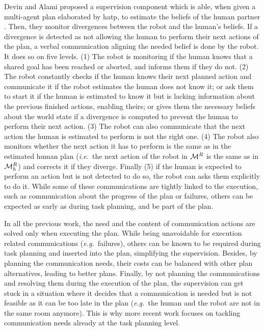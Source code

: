 \documentclass[a4paper,11pt,twoside]{StyleThese}
\begin{document}
Devin and Alami proposed a supervision component which is able, when given a multi-agent plan elaborated by \acrshort{hatp}, to estimate the beliefs of the human partner \cite{devin2016implemented}. Then, they monitor divergences between the robot and the human's beliefs. If a divergence is detected as not allowing the human to perform their next actions of the plan, a verbal communication aligning the needed belief is done by the robot. It does so on five levels. (1) The robot is monitoring if the human knows that a shared goal has been reached or aborted, and informs them if they do not. (2) The robot constantly checks if the human knows their next planned action and communicate it if the robot estimates the human does not know it; or ask them to start it if the human is estimated to know it but is lacking information about the previous finished actions, enabling theirs; or gives them the necessary beliefs about the world state if a divergence is computed to prevent the human to perform their next action. (3) The robot can also communicate that the next action the human is estimated to perform is not the right one. (4) The robot also monitors whether the next action it has to perform is the same as in the estimated human plan (\textit{i.e.}~the next action of the robot in $\mathcal{M}^R$ is the same as in $\mathcal{M}^R_h$) and corrects it if they diverge. Finally (5) if the human is expected to perform an action but is not detected to do so, the robot can asks them explicitly to do it. While some of these communications are tightly linked to the execution, such as communication about the progress of the plan or failures, others can be expected as early as during task planning, and be part of the plan. 

\medskip

In all the previous work, the need and the content of communication actions are solved only when executing the plan. While being unavoidable for execution related communications (\textit{e.g.}~failures), others can be known to be required during task planning and inserted into the plan, simplifying the supervision. Besides, by planning the communication needs, their costs can be balanced with other plan alternatives, leading to better plans. Finally, by not planning the communications and resolving them during the execution of the plan, the supervision can get stuck in a situation where it decides that a communication is needed but is not feasible as it can be too late in the plan (\textit{e.g.}~the human and the robot are not in the same room anymore). This is why more recent work focuses on tackling communication needs already at the task planning level.
\end{document}
